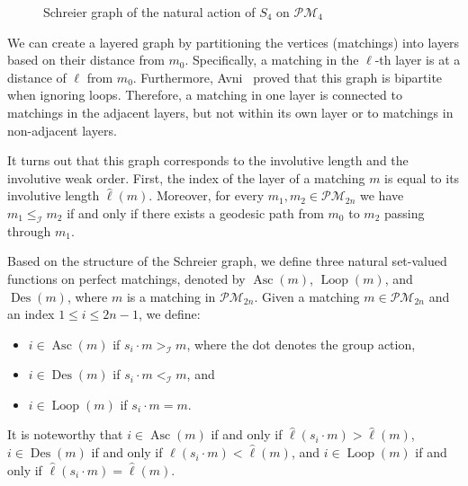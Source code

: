 \documentclass[ALCO]{cedram}
\newcommand{\Des}{\operatorname{Des}}
\newcommand{\Asc}{\operatorname{Asc}}
\newcommand{\Loop}{\operatorname{Loop}}
\newcommand{\I}{\mathcal{I}}
\newcommand{\PM}{\mathcal{PM}}
\begin{document}
\begin{figure}[htb]
    \begin{center}
        \usetikzlibrary{shapes}
    \end{center}
    \caption{Schreier graph of the natural action of $S_4$ on $\PM_4$}
    \label{fig:schreier graph example}
\end{figure}



We can create a layered graph by partitioning the vertices (matchings) into layers based on their distance from $m_0$. Specifically, a matching in the $\ell$-th layer is at a distance of $\ell$ from $m_0$. Furthermore, Avni~\cite{avni_perfect_matchings} proved that this graph is bipartite when ignoring loops. Therefore, a matching in one layer is connected to matchings in the adjacent layers, but not within its own layer or to matchings in non-adjacent layers.%

It turns out that this graph corresponds to the involutive length and the involutive weak order. First, the index of the layer of a matching $m$ is equal to its involutive length $\hat{\ell}(m)$. Moreover, for every $m_1, m_2 \in \PM_{2n}$ we have $m_1 \le_\I m_2$ if and only if there exists a geodesic path from $m_0$ to $m_2$ passing through $m_1$.

Based on the structure of the Schreier graph, we define three natural set-valued functions on perfect matchings, denoted by $\Asc(m)$, $\Loop(m)$, and $\Des(m)$, where $m$ is a matching in $\PM_{2n}$. Given a matching $m \in \PM_{2n}$ and an index $1 \leq i \leq 2n-1$, we define:
\begin{itemize}
    \item $i \in \Asc(m)$ if $s_i \cdot m >_\I m$, where the dot denotes the group action,
    \item $i \in \Des(m)$ if $s_i \cdot m <_\I m$, and
    \item $i \in \Loop(m)$ if $s_i \cdot m = m$.
\end{itemize}
It is noteworthy that $i\in \Asc(m)$ if and only if $\hat{\ell}(s_i \cdot m) > \hat{\ell}(m)$, $i\in \Des(m)$ if and only if $\hat{\ell}(s_i \cdot m) < \hat{\ell}(m)$, and $i\in \Loop(m)$ if and only if $\hat{\ell}(s_i \cdot m) = \hat{\ell}(m)$.
\end{document}
